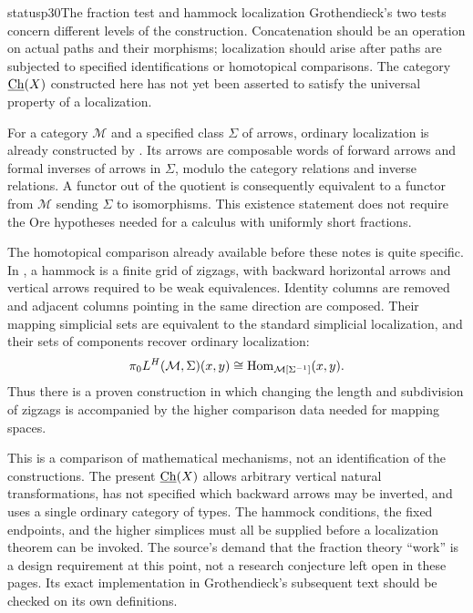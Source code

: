 \begin{dcomment}{status}{p30}{The fraction test and hammock localization}
Grothendieck's two tests concern different levels of the construction. Concatenation should be an operation on actual paths and their morphisms; localization should arise after paths are subjected to specified identifications or homotopical comparisons. The category $\underline{\mathrm{Ch}}(X)$ constructed here has not yet been asserted to satisfy the universal property of a localization.

For a category $\mathcal M$ and a specified class $\Sigma$ of arrows, ordinary localization is already constructed by \citet[Chapter~I, \S1.1 and Lemma~1.2]{GabrielZisman1967}. Its arrows are composable words of forward arrows and formal inverses of arrows in $\Sigma$, modulo the category relations and inverse relations. A functor out of the quotient is consequently equivalent to a functor from $\mathcal M$ sending $\Sigma$ to isomorphisms. This existence statement does not require the Ore hypotheses needed for a calculus with uniformly short fractions.

The homotopical comparison already available before these notes is quite specific. In \citet[Definition~2.1 and Propositions~2.2 and~3.1]{DwyerKan1980Calculating}, a hammock is a finite grid of zigzags, with backward horizontal arrows and vertical arrows required to be weak equivalences. Identity columns are removed and adjacent columns pointing in the same direction are composed. Their mapping simplicial sets are equivalent to the standard simplicial localization, and their sets of components recover ordinary localization:
\[
 \pi_0L^H(\mathcal M,\Sigma)(x,y)
   \cong\mathrm{Hom}_{\mathcal M[\Sigma^{-1}]}(x,y).
\]
Thus there is a proven construction in which changing the length and subdivision of zigzags is accompanied by the higher comparison data needed for mapping spaces.

This is a comparison of mathematical mechanisms, not an identification of the constructions. The present $\underline{\mathrm{Ch}}(X)$ allows arbitrary vertical natural transformations, has not specified which backward arrows may be inverted, and uses a single ordinary category of types. The hammock conditions, the fixed endpoints, and the higher simplices must all be supplied before a localization theorem can be invoked. The source's demand that the fraction theory ``work'' is a design requirement at this point, not a research conjecture left open in these pages. Its exact implementation in Grothendieck's subsequent text should be checked on its own definitions.
\end{dcomment}


